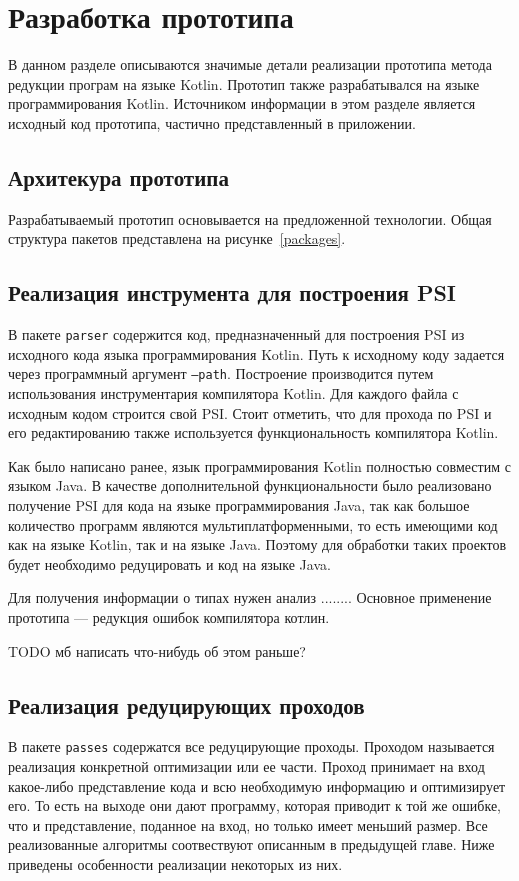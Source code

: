 \chapter{Разработка прототипа}
В данном разделе описываются значимые детали реализации прототипа метода редукции програм на языке Kotlin. Прототип также разрабатывался на языке программирования Kotlin. Источником информации в этом разделе является исходный код прототипа, частично представленный в приложении.
\section{Архитекура прототипа}
Разрабатываемый прототип основывается на предложенной технологии. Общая структура пакетов представлена на рисунке~\ref{packages}.

\section{Реализация инструмента для построения PSI}
В пакете \texttt{parser} содержится код, предназначенный для построения PSI из исходного кода языка программирования Kotlin. Путь к исходному коду задается через программный аргумент \texttt{--path}. Построение производится путем использования инструментария компилятора Kotlin. Для каждого файла с исходным кодом строится свой PSI. Стоит отметить, что для прохода по PSI и его редактированию также используется функциональность компилятора Kotlin.

Как было написано ранее, язык программирования Kotlin полностью совместим с языком Java. В качестве дополнительной функциональности было реализовано получение PSI для кода на языке программирования Java, так как большое количество программ являются мультиплатформенными, то есть имеющими код как на языке Kotlin, так и на языке Java. Поэтому для обработки таких проектов будет необходимо редуцировать и код на языке Java. 

Для получения информации о типах нужен анализ ........
Основное применение прототипа --- редукция ошибок компилятора котлин.

TODO мб написать что-нибудь об этом раньше?
\section{Реализация редуцирующих проходов}
В пакете \texttt{passes} содержатся все редуцирующие проходы. Проходом называется реализация конкретной оптимизации или ее части. Проход принимает на вход какое-либо представление кода и всю необходимую информацию и оптимизирует его. То есть на выходе они дают программу, которая приводит к той же ошибке, что и представление, поданное на вход, но только имеет меньший размер. Все реализованные алгоритмы соотвествуют описанным в предыдущей главе. Ниже приведены особенности реализации некоторых из них.

